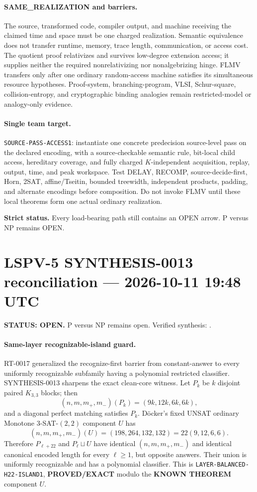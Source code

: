 \documentclass[11pt]{article}
\begin{document}
\paragraph{SAME\_REALIZATION and barriers.}
The source, transformed code, compiler output, and machine receiving the
claimed time and space must be one charged realization.  Semantic
equivalence does not transfer runtime, memory, trace length, communication,
or access cost.  The quotient proof relativizes and survives low-degree
extension access; it supplies neither the required nonrelativizing nor
nonalgebrizing hinge.  FLMV transfers only after one ordinary random-access
machine satisfies its simultaneous resource hypotheses.  Proof-system,
branching-program, VLSI, Schur-square, collision-entropy, and cryptographic
binding analogies remain restricted-model or analogy-only evidence.

\paragraph{Single team target.}
\texttt{SOURCE-PASS-ACCESS1}: instantiate one concrete predecision
source-level pass on the declared encoding, with a source-checkable semantic
rule, bit-local child access, hereditary coverage, and fully charged
$K$-independent acquisition, replay, output, time, and peak workspace.  Test
DELAY, RECOMP, source-decide-first, Horn, 2SAT, affine/Tseitin, bounded
treewidth, independent products, padding, and alternate encodings before
composition.  Do not invoke FLMV until these local theorems form one actual
ordinary realization.

\textbf{Strict status.} Every load-bearing path still contains an OPEN
arrow.  P versus NP remains OPEN.

\clearpage
\section{LSPV-5 SYNTHESIS-0013 reconciliation --- 2026-10-11 19:48 UTC}
\textbf{STATUS: OPEN.} P versus NP remains open. Verified synthesis:
.

\paragraph{Same-layer recognizable-island guard.}
RT-0017 generalized the recognize-first barrier from constant-answer to every
uniformly recognizable subfamily having a polynomial restricted classifier.
SYNTHESIS-0013 sharpens the exact clean-core witness.  Let $P_k$ be $k$
disjoint paired $K_{3,3}$ blocks; then
\[
 (n,m,m_+,m_-)(P_k)=(9k,12k,6k,6k),
\]
and a diagonal perfect matching satisfies $P_k$.  D\"ocker's fixed UNSAT
ordinary Monotone 3-SAT-$(2,2)$ component $U$ has
\[
 (n,m,m_+,m_-)(U)=(198,264,132,132)=22(9,12,6,6).
\]
Therefore $P_{\ell+22}$ and $P_\ell\sqcup U$ have identical
$(n,m,m_+,m_-)$ and identical canonical encoded length for every
$\ell\ge1$, but opposite answers.  Their union is uniformly recognizable
and has a polynomial classifier.  This is
\texttt{LAYER-BALANCED-H22-ISLAND1}, \textbf{PROVED/EXACT} modulo the
\textbf{KNOWN THEOREM} component $U$.
\end{document}
